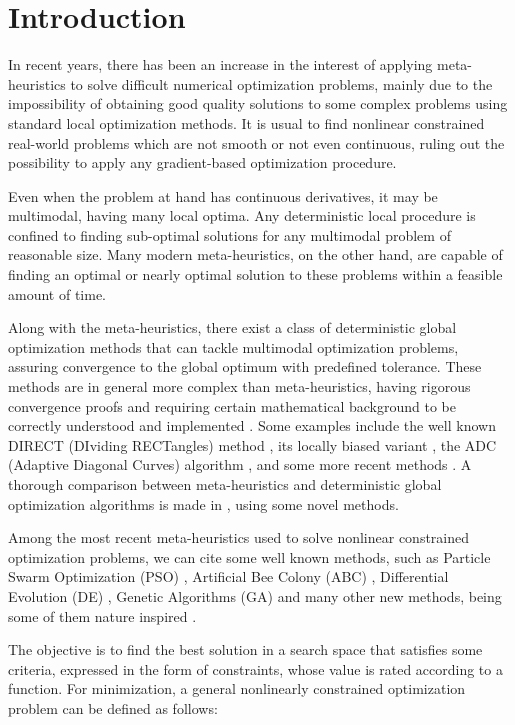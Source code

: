 \section{Introduction} \label{sec:Introduction}

In recent years, there has been an increase in the interest of applying meta-heuristics to solve difficult numerical optimization problems, mainly due to the impossibility of obtaining good quality solutions to some complex problems using standard local optimization methods. It is usual to find nonlinear constrained real-world problems which are not smooth or not even continuous, ruling out the possibility to apply any gradient-based optimization procedure.

Even when the problem at hand has continuous derivatives, it may be multimodal, having many local optima. Any deterministic local procedure is confined to finding sub-optimal solutions for any multimodal problem of reasonable size. Many modern meta-heuristics, on the other hand, are capable of finding an optimal or nearly optimal solution to these problems within a feasible amount of time.

Along with the meta-heuristics, there exist a class of deterministic global optimization methods that can tackle multimodal optimization problems, assuring convergence to the global optimum with predefined tolerance. These methods are in general more complex than meta-heuristics, having rigorous convergence proofs and requiring certain mathematical background to be correctly understood and implemented \citep{BOOKS1, BOOKS2, NAT}. Some examples include the well known DIRECT (DIviding RECTangles) method \citep{DIRECT}, its locally biased variant \citep{DIRECTL}, the ADC (Adaptive Diagonal Curves) algorithm \citep{ADC}, and some more recent methods \cite{ADC2, GEO, SIMP}. A thorough comparison between meta-heuristics and deterministic global optimization algorithms is made in \cite{NAT}, using some novel methods.

Among the most recent meta-heuristics used to solve nonlinear constrained optimization problems, we can cite some well known methods, such as Particle Swarm Optimization (PSO) \citep{IPSO, IAPSO, PSO1}, Artificial Bee Colony (ABC) \citep{CB-ABC, IABC-Mal}, Differential Evolution (DE) \citep{DE1, DE2, MVDE}, Genetic Algorithms (GA) \citep{GA1} and many other new methods, being some of them nature inspired \citep{CS, WCA, MBA}.

The objective is to find the best solution in a search space that satisfies some criteria, expressed in the form of constraints, whose value is rated according to a function. For minimization, a general nonlinearly constrained optimization problem can be defined as follows: \\[-3em]

